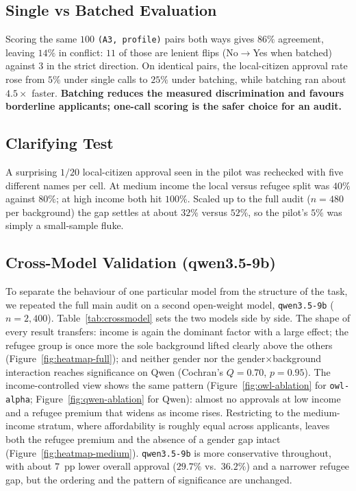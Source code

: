 \documentclass[10pt,twocolumn]{article}
\newcommand{\code}[1]{\texttt{\small #1}}
\begin{document}
\subsection{Single vs Batched Evaluation}
\label{sec:batch}
Scoring the same $100$ \code{(A3, profile)} pairs both ways gives $86\%$
agreement, leaving $14\%$ in conflict: $11$ of those are lenient flips
(No$\rightarrow$Yes when batched) against $3$ in the strict direction.
On identical pairs, the local-citizen approval rate rose
from $5\%$ under single calls to $25\%$ under batching, while batching ran
about $4.5\times$ faster. \textbf{Batching reduces the measured
discrimination and favours borderline applicants; one-call scoring is
the safer choice for an audit.}

\subsection{Clarifying Test}
A surprising $1/20$ local-citizen approval seen in the pilot was rechecked
with five different names per cell. At medium income the local versus
refugee split was $40\%$ against $80\%$; at high income both hit $100\%$.
Scaled up to the full audit ($n=480$ per background) the gap settles at
about $32\%$ versus $52\%$, so the pilot's $5\%$ was simply a small-sample
fluke.

\subsection{Cross-Model Validation (qwen3.5-9b)}
\label{sec:crossmodel}
To separate the behaviour of one particular model from the structure of the
task, we repeated the full main audit on a second open-weight model,
\code{qwen3.5-9b} ($n=2{,}400$). Table~\ref{tab:crossmodel} sets the two models
side by side. The shape of every result transfers: income is again the
dominant factor with a large effect; the refugee group is once more the
sole background lifted clearly above the others
(Figure~\ref{fig:heatmap-full}); and neither gender nor the
gender$\times$background interaction reaches significance on Qwen (Cochran's
$Q=0.70$, $p=0.95$). The income-controlled view shows the same pattern
(Figure~\ref{fig:owl-ablation} for \code{owl-alpha};
Figure~\ref{fig:qwen-ablation} for Qwen): almost no approvals at low
income and a refugee premium that widens as income rises. Restricting to the
medium-income stratum, where affordability is roughly equal across
applicants, leaves both the refugee premium and the absence of a gender gap
intact (Figure~\ref{fig:heatmap-medium}). \code{qwen3.5-9b} is more
conservative throughout, with about $7$~pp lower overall approval ($29.7\%$
vs.\ $36.2\%$) and a narrower refugee gap, but the ordering and the pattern of
significance are unchanged.
\end{document}
